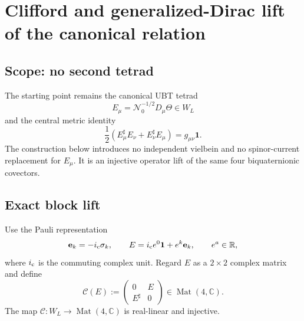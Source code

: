 
\section{Clifford and generalized-Dirac lift of the canonical relation}
\label{sec:canonical:biquaternion_dirac_lift}

\subsection{Scope: no second tetrad}
The starting point remains the canonical UBT tetrad
\begin{equation}
 E_\mu=\mathcal N_0^{-1/2}D_\mu\Theta\in W_L
\end{equation}
and the central metric identity
\begin{equation}
 \frac12(E_\mu^\sharp E_\nu+E_\nu^\sharp E_\mu)
 =g_{\mu\nu}\mathbf1.
 \label{eq:canonical:metric-before-dirac-lift}
\end{equation}
The construction below introduces no independent vielbein and no spinor-current
replacement for $E_\mu$.  It is an injective operator lift of the same four
biquaternionic covectors.

\subsection{Exact block lift}
Use the Pauli representation
\begin{equation}
 \mathbf e_k=-i_{\rm c}\sigma_k,
 \qquad
 E=i_{\rm c}e^0\mathbf1+e^k\mathbf e_k,
 \qquad e^a\in\mathbb R,
\end{equation}
where $i_{\rm c}$ is the commuting complex unit.  Regard $E$ as a
$2\times2$ complex matrix and define
\begin{equation}
 \boxed{
 \mathcal C(E):=
 \begin{pmatrix}
 0&E\\ E^\sharp&0
 \end{pmatrix}\in\operatorname{Mat}(4,\mathbb C).}
 \label{eq:canonical:block-clifford-lift}
\end{equation}
The map $\mathcal C:W_L\to\operatorname{Mat}(4,\mathbb C)$ is real-linear and
injective.


